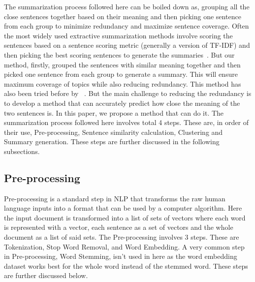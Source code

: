 The summarization process followed here can be boiled down as, grouping all the close sentences
together based on their meaning and then picking one sentence from each group to minimize redundancy
and maximize sentence coverage.
Often the most widely used extractive summarization methods involve scoring the sentences
based on a sentence scoring metric (generally a version of TF-IDF) and
then picking the best scoring sentences to generate the
summaries~\cite{Akter-2017-tfidf-3,das-2022-tfidf,sarkar-2012-tfidf,sarkar-2012-tfidf-2}.
But our method, firstly, grouped the sentences with similar meaning together and then picked one
sentence from each group to generate a summary.
This will ensure maximum coverage of topics while also reducing redundancy.
This method has also been tried before by \citeauthor{roychowdhury-etal-2022-spectral-base}
~\cite{roychowdhury-etal-2022-spectral-base}.
But the main challenge to reducing the redundancy is to develop a method that can accurately predict how close the
meaning of the two sentences is.
In this paper, we propose a method that can do it.
The summarization process followed here involves total 4 steps.
These are, in order of their use, Pre-processing, Sentence similarity calculation, Clustering and Summary generation.
These steps are further discussed in the following subsections.

\subsection{Pre-processing}\label{subsec:pre-processing}
Pre-processing is a standard step in NLP that transforms the raw human language
inputs into a format that can be used by a computer algorithm.
Here the input document is transformed into a list of sets of vectors where each word is represented
with a vector, each sentence as a set of vectors and the whole document as a list of said sets.
The Pre-processing involves 3 steps.
These are Tokenization, Stop Word Removal, and Word Embedding.
A very common step in Pre-processing, Word Stemming, isn't used in here as the word embedding dataset
works best for the whole word instead of the stemmed word.
These steps are further discussed below.\\

